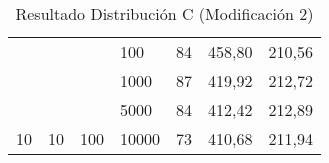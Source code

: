 \documentclass{article}
\begin{document}
\begin{table}[h]
\begin{tabular}{lllllll}
			&                                                &                                                                       &                                                                           &                                                                              &                                                                                     &                                                                                       \\ \hline
			\multicolumn{1}{|l|}{}                                                 & \multicolumn{1}{l|}{}                          & \multicolumn{1}{l|}{}                                                 & \multicolumn{1}{l|}{100}                                                  & \multicolumn{1}{l|}{84}                                                      & \multicolumn{1}{l|}{458,80}                                                         & \multicolumn{1}{l|}{210,56}                                                           \\ \cline{4-7} 
			\multicolumn{1}{|l|}{}                                                 & \multicolumn{1}{l|}{}                          & \multicolumn{1}{l|}{}                                                 & \multicolumn{1}{l|}{1000}                                                 & \multicolumn{1}{l|}{87}                                                      & \multicolumn{1}{l|}{419,92}                                                         & \multicolumn{1}{l|}{212,72}                                                           \\ \cline{4-7} 
			\multicolumn{1}{|l|}{}                                                 & \multicolumn{1}{l|}{}                          & \multicolumn{1}{l|}{}                                                 & \multicolumn{1}{l|}{5000}                                                 & \multicolumn{1}{l|}{84}                                                      & \multicolumn{1}{l|}{412,42}                                                         & \multicolumn{1}{l|}{212,89}                                                           \\ \cline{4-7} 
			\multicolumn{1}{|l|}{\multirow{-4}{*}{10}}                             & \multicolumn{1}{l|}{\multirow{-4}{*}{10}}      & \multicolumn{1}{l|}{\multirow{-4}{*}{100}}                            & \multicolumn{1}{l|}{10000}                                                & \multicolumn{1}{l|}{73}                                                      & \multicolumn{1}{l|}{410,68}                                                         & \multicolumn{1}{l|}{211,94}                                                           \\ \hline
		\end{tabular}
	\caption{Resultado Distribución C (Modificación 2)}
	\end{table}
\end{document}
